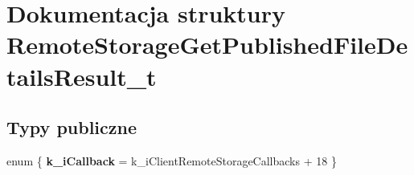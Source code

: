 \hypertarget{struct_remote_storage_get_published_file_details_result__t}{}\section{Dokumentacja struktury Remote\+Storage\+Get\+Published\+File\+Details\+Result\+\_\+t}
\label{struct_remote_storage_get_published_file_details_result__t}
\subsection*{Typy publiczne}
\begin{DoxyCompactItemize}
\item 
\mbox{\label{struct_remote_storage_get_published_file_details_result__t_af00826ab4d2a2f032612538ce0aec130}} 
enum \{ {\bfseries k\+\_\+i\+Callback} = k\+\_\+i\+Client\+Remote\+Storage\+Callbacks + 18
 \}
\end{DoxyCompactItemize}
